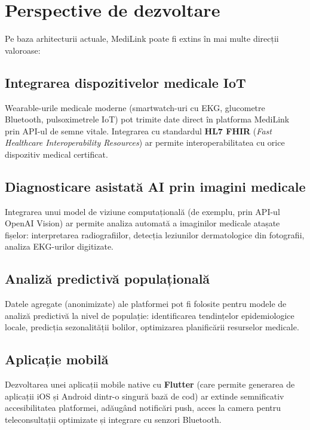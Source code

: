 \section{Perspective de dezvoltare}

Pe baza arhitecturii actuale, MediLink poate fi extins în mai multe direcții valoroase:

\subsection{Integrarea dispozitivelor medicale IoT}

Wearable-urile medicale moderne (smartwatch-uri cu EKG, glucometre Bluetooth, pulsoximetrele IoT) pot trimite date direct în platforma MediLink prin API-ul de semne vitale. Integrarea cu standardul \textbf{HL7 FHIR} (\textit{Fast Healthcare Interoperability Resources}) \cite{fhir2024} ar permite interoperabilitatea cu orice dispozitiv medical certificat.

\subsection{Diagnosticare asistată AI prin imagini medicale}

Integrarea unui model de viziune computațională (de exemplu, prin API-ul OpenAI Vision) ar permite analiza automată a imaginilor medicale atașate fișelor: interpretarea radiografiilor, detecția leziunilor dermatologice din fotografii, analiza EKG-urilor digitizate.

\subsection{Analiză predictivă populațională}

Datele agregate (anonimizate) ale platformei pot fi folosite pentru modele de analiză predictivă la nivel de populație: identificarea tendințelor epidemiologice locale, predicția sezonalității bolilor, optimizarea planificării resurselor medicale.

\subsection{Aplicație mobilă}

Dezvoltarea unei aplicații mobile native cu \textbf{Flutter} \cite{flutter2024} (care permite generarea de aplicații iOS și Android dintr-o singură bază de cod) ar extinde semnificativ accesibilitatea platformei, adăugând notificări push, acces la camera pentru teleconsultații optimizate și integrare cu senzori Bluetooth.

